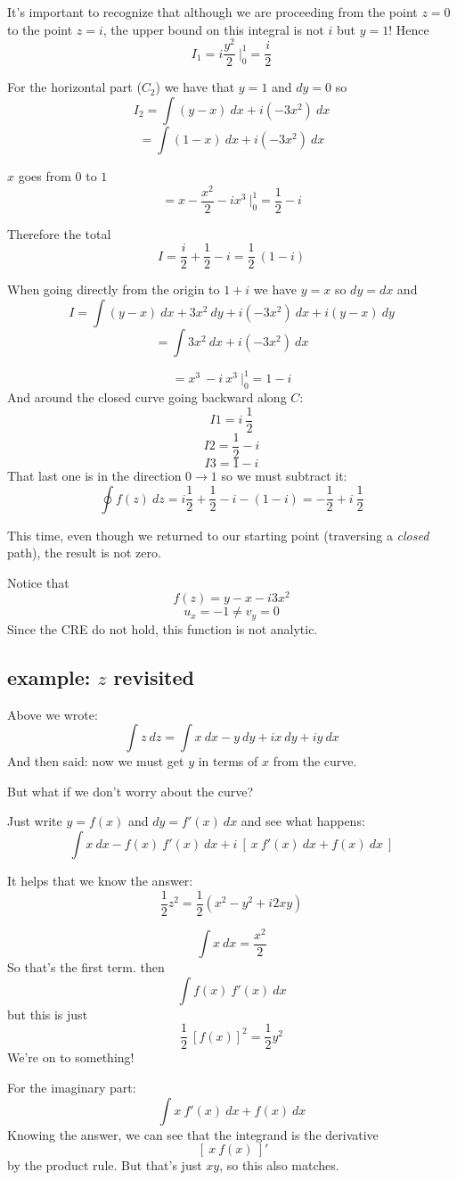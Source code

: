\documentclass[11pt, oneside]{article}
\begin{document}
It's important to recognize that although we are proceeding from the point $z=0$ to the point $z = i$, the upper bound on this integral is not $i$ but $y = 1$!  Hence
\[ I_1 = i\frac{y^2}{2} \ \bigg |_0^1 = \frac{i}{2} \]

For the horizontal part ($C_2$) we have that $y=1$ and $dy = 0$ so
\[ I_2 = \int (y - x) \ dx + i (-3x^2) \ dx  \]
\[ = \int (1 - x) \ dx + i (-3x^2) \ dx \]

$x$ goes from $0$ to $1$
\[ = x - \frac{x^2}{2} - ix^3 \ \bigg |_0^1 = \frac{1}{2} - i \]

Therefore the total
\[ I = \frac{i}{2} + \frac{1}{2} - i = \frac{1}{2} \ (1 - i) \]

When going directly from the origin to $1 + i$ we have $y = x$ so $dy = dx$ and
\[ I = \int (y - x) \ dx + 3x^2 \ dy + i (-3x^2) \ dx + i (y-x) \ dy \]
\[ = \int 3x^2 \ dx + i (-3x^2) \ dx  \]

\[ =  x^3 \  -i  \ x^3 \ \bigg |_0^1  = 1  - i \]
And around the closed curve going backward along $C$:
\[ I1 = i \ \frac{1}{2} \]
\[ I2 = \frac{1}{2} - i \]
\[ I3 = 1 - i \]
That last one is in the direction $0 \rightarrow 1$ so we must subtract it:
\[ \oint f(z) \ dz = i \frac{1}{2} + \frac{1}{2} - i - (1  - i) =  -\frac{1}{2} + i \ \frac{1}{2} \]

This time, even though we returned to our starting point (traversing a \emph{closed} path), the result is not zero.

Notice that
\[ f(z) = y - x - i3x^2 \]
\[ u_x = -1 \ne v_y = 0 \]
Since the CRE do not hold, this function is not analytic.

\subsection*{example: $z$ revisited}
Above we wrote:
\[ \int z \ dz = \int x \ dx - y \ dy + i x \ dy + i y \ dx \]
And then said:  now we must get $y$ in terms of $x$ from the curve.

But what if we don't worry about the curve?  

Just write $y = f(x)$ and $dy = f'(x) \ dx$ and see what happens:
\[ \int x \ dx - f(x) \ f'(x) \ dx + i \ [ \ x \  f'(x) \ dx + f(x) \ dx \ ]  \]

It helps that we know the answer:
\[ \frac{1}{2} z^2 = \frac{1}{2} (x^2 - y^2 + i 2xy) \]

\[ \int x \ dx = \frac{x^2}{2} \]
So that's the first term.  then
\[ \int f(x) \ f'(x) \ dx \]
but this is just
\[ \frac{1}{2} \ [f(x)]^2 = \frac{1}{2} y^2 \]
We're on to something!

For the imaginary part:
\[ \int x \  f'(x) \ dx + f(x) \ dx \]
Knowing the answer, we can see that the integrand is the derivative
\[ \ [ \ x \ f(x) \ ]' \]
by the product rule.  But that's just $xy$, so this also matches. 
\end{document}
